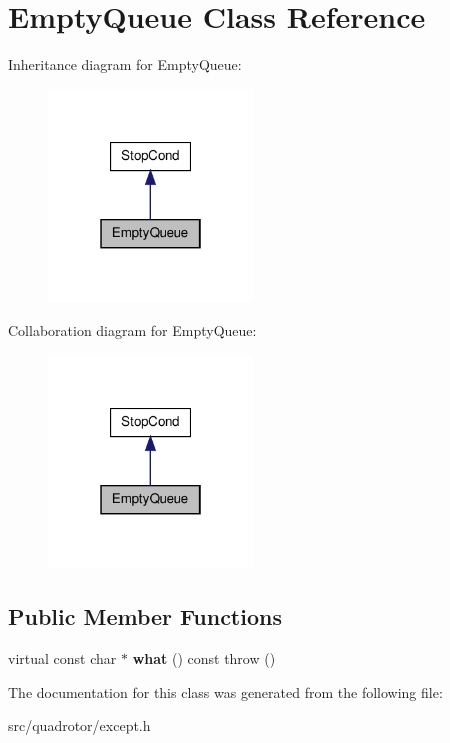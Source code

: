 \hypertarget{classEmptyQueue}{\section{\-Empty\-Queue \-Class \-Reference}
\label{classEmptyQueue}
}


\-Inheritance diagram for \-Empty\-Queue\-:\nopagebreak
\begin{figure}[H]
\begin{center}
\leavevmode
\includegraphics[width=154pt]{classEmptyQueue__inherit__graph}
\end{center}
\end{figure}


\-Collaboration diagram for \-Empty\-Queue\-:\nopagebreak
\begin{figure}[H]
\begin{center}
\leavevmode
\includegraphics[width=154pt]{classEmptyQueue__coll__graph}
\end{center}
\end{figure}
\subsection*{\-Public \-Member \-Functions}
\begin{DoxyCompactItemize}
\item 
\hypertarget{classEmptyQueue_a57d73966a7700462d877b441299522d0}{virtual const char $\ast$ {\bfseries what} () const   throw ()}\label{classEmptyQueue_a57d73966a7700462d877b441299522d0}

\end{DoxyCompactItemize}


\-The documentation for this class was generated from the following file\-:\begin{DoxyCompactItemize}
\item 
src/quadrotor/except.\-h\end{DoxyCompactItemize}
